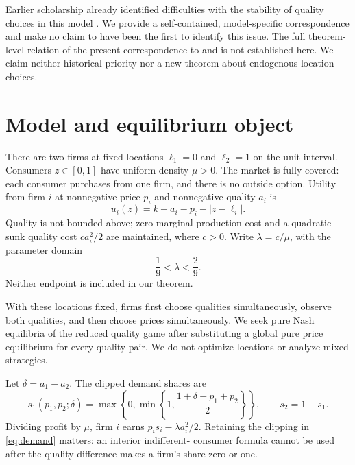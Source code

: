 \documentclass[11pt]{article}
\begin{document}
Earlier scholarship already identified difficulties
with the stability of quality choices in this model
\citep{Bunte1995,Bunte1997,Sorenson1995}. We provide a
self-contained, model-specific correspondence and make
no claim to have been the first to identify this issue.
The full theorem-level relation of the present
correspondence to \citet{Bunte1995} and
\citet{Sorenson1995} is not established here.
We claim neither historical priority nor a
new theorem about endogenous location choices.

\section{Model and equilibrium object}\label{sec:model}
There are two firms at fixed locations $\ell_1=0$ and
$\ell_2=1$ on the unit interval. Consumers $z\in[0,1]$
have uniform density $\mu>0$. The market is fully
covered: each consumer purchases from one firm,
and there is no outside option. Utility from firm $i$
at nonnegative price $p_i$ and nonnegative quality
$a_i$ is
\begin{equation}\label{eq:utility}
u_i(z)=k+a_i-p_i-|z-\ell_i|.
\end{equation}
Quality is not bounded above; zero marginal production
cost and a quadratic sunk quality cost
$ca_i^2/2$ are maintained, where $c>0$.
Write $\lambda=c/\mu$, with the parameter domain
\begin{equation}\label{eq:domain}
\frac19<\lambda<\frac29.
\end{equation}
Neither endpoint is included in our theorem.

With these locations fixed, firms first choose qualities
simultaneously, observe both qualities, and then choose
prices simultaneously. We seek pure Nash equilibria of
the reduced quality game after substituting a global
pure price equilibrium for every quality pair.
We do not optimize locations or analyze mixed strategies.

Let $\delta=a_1-a_2$. The clipped demand shares are
\begin{equation}\label{eq:demand}
s_1(p_1,p_2;\delta)=
\max\left\{0,\min\left\{1,
\frac{1+\delta-p_1+p_2}{2}\right\}\right\},
\qquad s_2=1-s_1.
\end{equation}
Dividing profit by $\mu$, firm $i$ earns
$p_i s_i-\lambda a_i^2/2$. Retaining the clipping
in \eqref{eq:demand} matters: an interior indifferent-
consumer formula cannot be used after the quality
difference makes a firm's share zero or one.
\end{document}
